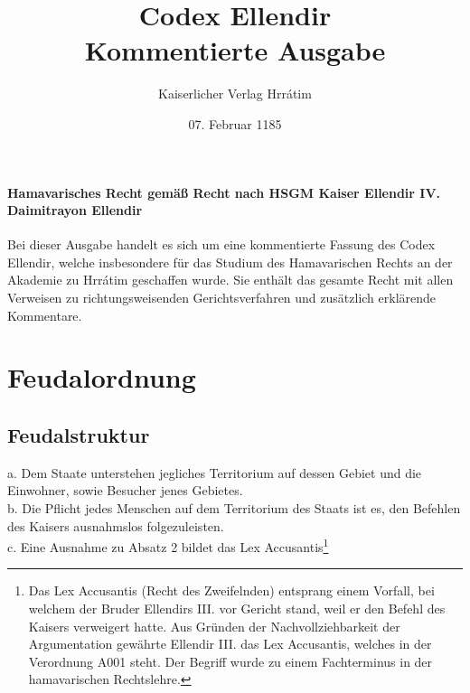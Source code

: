 \documentclass{article}
\title{Codex Ellendir\\Kommentierte Ausgabe}
\author{Kaiserlicher Verlag Hrrátim}
\date{07. Februar 1185}
\begin{document}
\maketitle
\vspace*{\fill}
\paragraph{Hamavarisches Recht gemäß Recht nach HSGM Kaiser Ellendir IV. Daimitrayon Ellendir}

\newpage
Bei dieser Ausgabe handelt es sich um eine kommentierte Fassung des Codex Ellendir, welche insbesondere für das Studium des Hamavarischen Rechts an der Akademie zu Hrrátim geschaffen wurde. Sie enthält das gesamte Recht mit allen Verweisen zu richtungsweisenden Gerichtsverfahren und zusätzlich erklärende Kommentare.
\newpage
\section{Feudalordnung}
\subsection{Feudalstruktur}
a.  Dem Staate unterstehen jegliches Territorium auf dessen Gebiet und die Einwohner, sowie Besucher jenes Gebietes.\\
b. Die Pflicht jedes Menschen auf dem Territorium des Staats ist es, den Befehlen des Kaisers ausnahmslos folgezuleisten.\\
c. Eine Ausnahme zu Absatz 2 bildet das Lex Accusantis\footnote{Das Lex Accusantis (Recht des Zweifelnden) entsprang einem Vorfall, bei welchem der Bruder Ellendirs III. vor Gericht stand, weil er den Befehl des Kaisers verweigert hatte. Aus Gründen der Nachvollziehbarkeit der Argumentation gewährte Ellendir III. das Lex Accusantis, welches in der Verordnung A001 steht. Der Begriff wurde zu einem Fachterminus in der hamavarischen Rechtslehre.}
\end{document}
